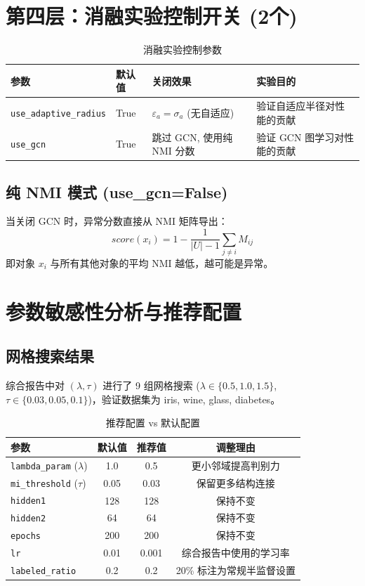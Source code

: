 \documentclass[11pt,a4paper]{ctexart}
\begin{document}
\section{第四层：消融实验控制开关 (2个)}

\begin{table}[H]\centering\caption{消融实验控制参数}\small
\begin{tabular}{lllp{7cm}}
\toprule
参数 & 默认值 & 关闭效果 & 实验目的 \\
\midrule
\texttt{use\_adaptive\_radius} & True & $\varepsilon_a = \sigma_a$ (无自适应) & 验证自适应半径对性能的贡献 \\
\texttt{use\_gcn} & True & 跳过 GCN, 使用纯 NMI 分数 & 验证 GCN 图学习对性能的贡献 \\
\bottomrule
\end{tabular}\end{table}

\subsection{纯 NMI 模式 (use\_gcn=False)}

当关闭 GCN 时，异常分数直接从 NMI 矩阵导出：
\[
score(x_i) = 1 - \frac{1}{|U|-1} \sum_{j \neq i} M_{ij}
\]
即对象 $x_i$ 与所有其他对象的平均 NMI 越低，越可能是异常。

\section{参数敏感性分析与推荐配置}

\subsection{网格搜索结果}
综合报告中对 $(\lambda, \tau)$ 进行了 9 组网格搜索 ($\lambda \in \{0.5, 1.0, 1.5\}$, $\tau \in \{0.03, 0.05, 0.1\}$)，验证数据集为 iris, wine, glass, diabetes。

\begin{table}[H]\centering\caption{推荐配置 vs 默认配置}\small
\begin{tabular}{lccc}
\toprule
参数 & 默认值 & 推荐值 & 调整理由 \\
\midrule
\texttt{lambda\_param} ($\lambda$) & 1.0 & 0.5 & 更小邻域提高判别力 \\
\texttt{mi\_threshold} ($\tau$) & 0.05 & 0.03 & 保留更多结构连接 \\
\texttt{hidden1} & 128 & 128 & 保持不变 \\
\texttt{hidden2} & 64 & 64 & 保持不变 \\
\texttt{epochs} & 200 & 200 & 保持不变 \\
\texttt{lr} & 0.01 & 0.001 & 综合报告中使用的学习率 \\
\texttt{labeled\_ratio} & 0.2 & 0.2 & 20\% 标注为常规半监督设置 \\
\bottomrule
\end{tabular}\end{table}
\end{document}

